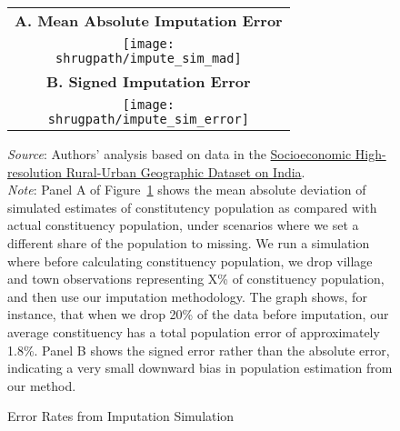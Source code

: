 \documentclass[12pt,letterpaper]{article}
\newcommand{\panel}{\fontfamily{phv}\selectfont\scriptsize\textbf}
\begin{document}
\begin{appendix}

\begin{figure}[H]
  \caption{Error Rates from Imputation Simulation}
  \begin{center}
  \begin{tabular}{c}
    \panel{A. Mean Absolute Imputation Error} \\
    \texttt{[image: \\shrugpath/impute\_sim\_mad]} \\
    \panel{B. Signed Imputation Error} \\
    \texttt{[image: \\shrugpath/impute\_sim\_error]} \\
  \end{tabular}
  
  \end{center}
  \begin{adjustwidth}{2cm}{2cm}
    \scriptsize{\textit{Source}: Authors' analysis based on data in
      the \href{http://www.devdatalab.org/shrug}{Socioeconomic
        High-resolution Rural-Urban Geographic Dataset on
        India}. \\ \textit{Note}: Panel A of
      Figure~\ref{fig:impute_error} shows the mean absolute deviation
      of simulated estimates of constitutency population as compared
      with actual constituency population, under scenarios where we
      set a different share of the population to missing. We run a
      simulation where before calculating constituency population, we
      drop village and town observations representing X\% of
      constituency population, and then use our imputation
      methodology. The graph shows, for instance, that when we drop
      20\% of the data before imputation, our average constituency has
      a total population error of approximately 1.8\%. Panel B shows
      the signed error rather than the absolute error, indicating a
      very small downward bias in population estimation from our
      method.}
  \end{adjustwidth}
  \label{fig:impute_error}
\end{figure}

\end{appendix}
  
\end{document}
